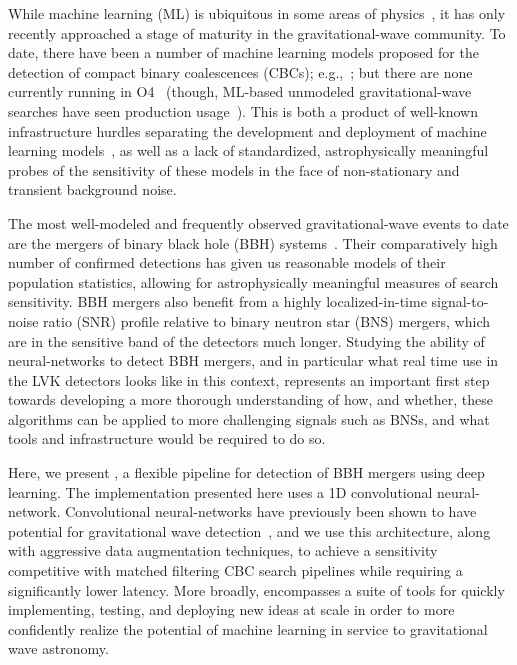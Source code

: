 \begin{refsection}
While machine learning (ML) is ubiquitous in some areas of physics~\cite{harris2022physics}, it has only recently approached a stage of maturity in the gravitational-wave community.
To date, there have been a number of machine learning models proposed for the detection of compact binary coalescences (CBCs); e.g.,~\cite{PhysRevD.103.102003, verma2022can, KRASTEV2020135330, PhysRevD.97.044039, nousi2022deep}; but there are none currently running in O4~\cite{online_pipelines} (though, ML-based unmodeled gravitational-wave searches have seen production usage~\cite{mly}).
This is both a product of well-known infrastructure hurdles separating the development and deployment of machine learning models~\cite{deployment_challenges}, as well as a lack of standardized, astrophysically meaningful probes of the sensitivity of these models in the face of non-stationary and transient background noise.

The most well-modeled and frequently observed gravitational-wave events to date are the mergers of binary black hole (BBH) systems~\cite{AbEA2018b, theligoscientificcollaboration2022gwtc21, Abbott_2023}.
Their comparatively high number of confirmed detections has given us reasonable models of their population statistics, allowing for astrophysically meaningful measures of search sensitivity. 
BBH mergers also benefit from a highly localized-in-time signal-to-noise ratio (SNR) profile relative to binary neutron star (BNS) mergers, which are in the sensitive band of the detectors much longer. 
Studying the ability of neural-networks to detect BBH mergers, and in particular what real time use in the LVK detectors looks like in this context, represents an important first step towards developing a more thorough understanding of how, and whether, these algorithms can be applied to more challenging signals such as BNSs, and what tools and infrastructure would be required to do so.

Here, we present \aframe, a flexible pipeline for detection of BBH mergers using deep learning.
The implementation presented here uses a 1D convolutional neural-network. 
Convolutional neural-networks have previously been shown to have potential for gravitational wave detection~\cite{magicbullet}, and we use this architecture, along with aggressive data augmentation techniques, to achieve a sensitivity competitive with matched filtering CBC search pipelines while requiring a significantly lower latency.
More broadly, \aframe encompasses a suite of tools for quickly implementing, testing, and deploying new ideas at scale in order to more confidently realize the potential of machine learning in service to gravitational wave astronomy.


\end{refsection}
